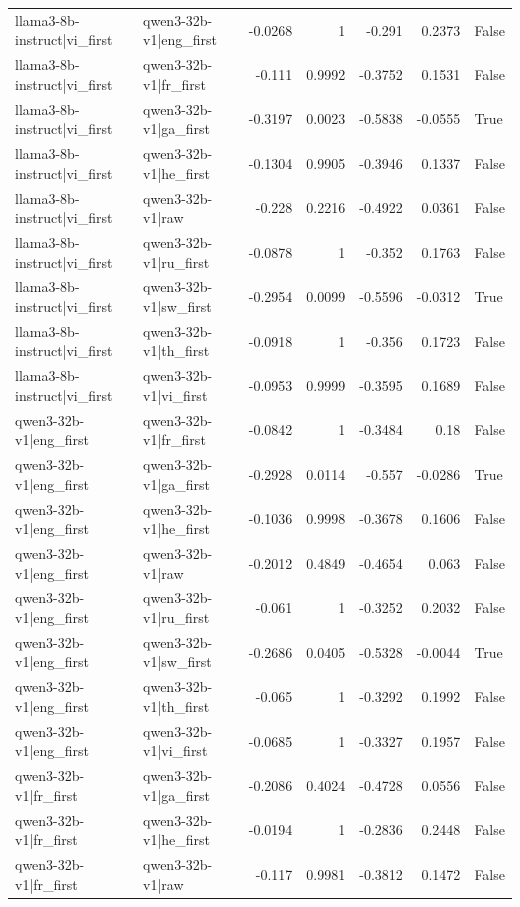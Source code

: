\begin{table}
\begin{tabular}{l l r r r r l}
llama3-8b-instruct|vi_first & qwen3-32b-v1|eng_first & -0.0268 & 1 & -0.291 & 0.2373 & False \\
llama3-8b-instruct|vi_first & qwen3-32b-v1|fr_first & -0.111 & 0.9992 & -0.3752 & 0.1531 & False \\
llama3-8b-instruct|vi_first & qwen3-32b-v1|ga_first & -0.3197 & 0.0023 & -0.5838 & -0.0555 & True \\
llama3-8b-instruct|vi_first & qwen3-32b-v1|he_first & -0.1304 & 0.9905 & -0.3946 & 0.1337 & False \\
llama3-8b-instruct|vi_first & qwen3-32b-v1|raw & -0.228 & 0.2216 & -0.4922 & 0.0361 & False \\
llama3-8b-instruct|vi_first & qwen3-32b-v1|ru_first & -0.0878 & 1 & -0.352 & 0.1763 & False \\
llama3-8b-instruct|vi_first & qwen3-32b-v1|sw_first & -0.2954 & 0.0099 & -0.5596 & -0.0312 & True \\
llama3-8b-instruct|vi_first & qwen3-32b-v1|th_first & -0.0918 & 1 & -0.356 & 0.1723 & False \\
llama3-8b-instruct|vi_first & qwen3-32b-v1|vi_first & -0.0953 & 0.9999 & -0.3595 & 0.1689 & False \\
qwen3-32b-v1|eng_first & qwen3-32b-v1|fr_first & -0.0842 & 1 & -0.3484 & 0.18 & False \\
qwen3-32b-v1|eng_first & qwen3-32b-v1|ga_first & -0.2928 & 0.0114 & -0.557 & -0.0286 & True \\
qwen3-32b-v1|eng_first & qwen3-32b-v1|he_first & -0.1036 & 0.9998 & -0.3678 & 0.1606 & False \\
qwen3-32b-v1|eng_first & qwen3-32b-v1|raw & -0.2012 & 0.4849 & -0.4654 & 0.063 & False \\
qwen3-32b-v1|eng_first & qwen3-32b-v1|ru_first & -0.061 & 1 & -0.3252 & 0.2032 & False \\
qwen3-32b-v1|eng_first & qwen3-32b-v1|sw_first & -0.2686 & 0.0405 & -0.5328 & -0.0044 & True \\
qwen3-32b-v1|eng_first & qwen3-32b-v1|th_first & -0.065 & 1 & -0.3292 & 0.1992 & False \\
qwen3-32b-v1|eng_first & qwen3-32b-v1|vi_first & -0.0685 & 1 & -0.3327 & 0.1957 & False \\
qwen3-32b-v1|fr_first & qwen3-32b-v1|ga_first & -0.2086 & 0.4024 & -0.4728 & 0.0556 & False \\
qwen3-32b-v1|fr_first & qwen3-32b-v1|he_first & -0.0194 & 1 & -0.2836 & 0.2448 & False \\
qwen3-32b-v1|fr_first & qwen3-32b-v1|raw & -0.117 & 0.9981 & -0.3812 & 0.1472 & False \\

\end{tabular}
\end{table}
